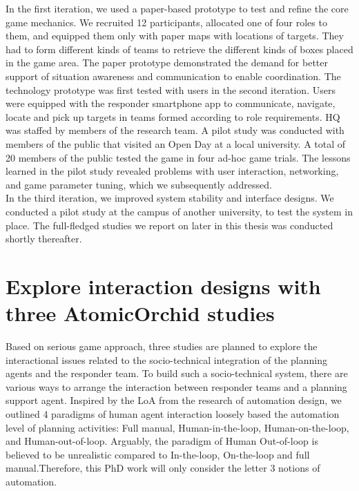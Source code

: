 In the first iteration, we used a paper-based prototype to test and refine the core game mechanics. We recruited 12 participants, allocated one of four roles to them, and equipped them only with paper maps with locations of targets. They had to form different kinds of teams to retrieve the different kinds of boxes placed in the game area. The paper prototype demonstrated the demand for better support of situation awareness and communication to enable coordination. The technology prototype was first tested with users in the second iteration. Users were equipped with the responder smartphone app to communicate, navigate, locate and pick up targets in teams formed according to role requirements. HQ was staffed by members of the research team. A pilot study was conducted with members of the public that visited an Open Day at a local university. A total of 20 members of the public tested the game in four ad-hoc game trials. The lessons learned in the pilot study revealed problems with user interaction, networking, and game parameter tuning, which we subsequently addressed.\\

In the third iteration, we improved system stability and interface designs. We conducted a pilot study at the campus of another university, to test the system in place. The full-fledged studies we report on later in this thesis was conducted shortly thereafter.\\


\section{Explore interaction designs with three AtomicOrchid studies}\label{sec:patterns} \label{sec:approachPatterns}


Based on serious game approach, three studies are planned to explore the interactional issues related to the socio-technical integration of the planning agents and the responder team. To build such a socio-technical system, there are various ways to arrange the interaction between responder teams and a planning support agent. Inspired by the \acf{LoA} from the research of automation design, we outlined 4 paradigms of human agent interaction loosely based the automation level of planning activities: Full manual, Human-in-the-loop, Human-on-the-loop, and Human-out-of-loop. Arguably, the paradigm of Human Out-of-loop is believed to be unrealistic compared to In-the-loop, On-the-loop and full manual.Therefore, this PhD work will only consider the letter 3 notions of automation.\\

